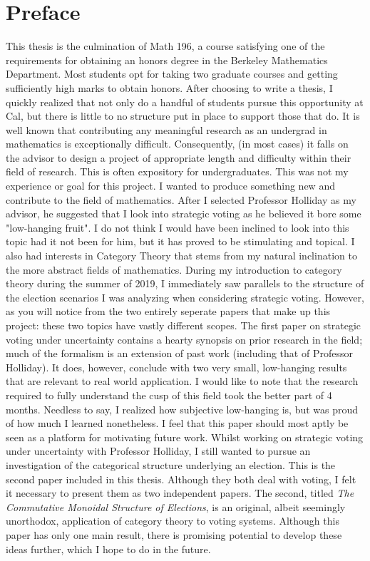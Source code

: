 \documentclass{article}
\begin{document}
\section*{Preface}
This thesis is the culmination of Math 196, a course satisfying one of the requirements for obtaining an honors degree in the Berkeley Mathematics Department. Most students opt for taking two graduate courses and getting sufficiently high marks to obtain honors. After choosing to write a thesis, I quickly realized that not only do a handful of students pursue this opportunity at Cal, but there is little to no structure put in place to support those that do. It is well known that contributing any meaningful research as an undergrad in mathematics is exceptionally difficult. Consequently, (in most cases) it falls on the advisor to design a project of appropriate length and difficulty within their field of research. This is often expository for undergraduates. This was not my experience or goal for this project. I wanted to produce something new and contribute to the field of mathematics. After I selected Professor Holliday as my advisor, he suggested that I look into strategic voting  as he believed it bore some "low-hanging fruit". I do not think I would have been inclined to look into this topic had it not been for him, but it has proved to be stimulating and topical. I also had interests in Category Theory that stems from my natural inclination to the more abstract fields of mathematics. During my introduction to category theory during the summer of 2019, I immediately saw parallels to the structure of the election scenarios I was analyzing when considering strategic voting. However, as you will notice from the two entirely seperate papers that make up this project: these two topics have vastly different scopes. The first paper on strategic voting under uncertainty contains a hearty synopsis on prior research in the field; much of the formalism is an extension of past work (including that of Professor Holliday). It does, however, conclude with two very small, low-hanging results that are relevant to real world application. I would like to note that the research required to fully understand the cusp of this field took the better part of 4 months. Needless to say, I realized how subjective low-hanging is, but was proud of how much I learned nonetheless. I feel that this paper should most aptly be seen as a platform for motivating future work. Whilst working on strategic voting under uncertainty with Professor Holliday, I still wanted to pursue an investigation of the categorical structure underlying an election. This is the second paper included in this thesis. Although they both deal with voting, I felt it necessary to present them as two independent papers. The second, titled \textit{The Commutative Monoidal Structure of Elections}, is an original, albeit seemingly unorthodox, application of category theory to voting systems. Although this paper has only one main result, there is promising potential to develop these ideas further, which I hope to do in the future.  




\end{document}
